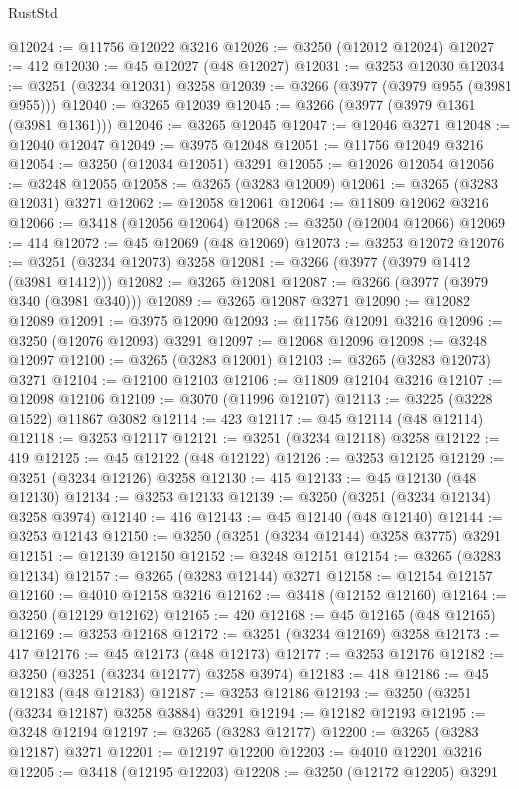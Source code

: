 \begin{lexlean}{RustStd}
\begin{coremodule}
@12024 := @11756 @12022 @3216
@12026 := @3250 (@12012 @12024)
@12027 := 412
@12030 := @45 @12027 (@48 @12027)
@12031 := @3253 @12030
@12034 := @3251 (@3234 @12031) @3258
@12039 := @3266 (@3977 (@3979 @955 (@3981 @955)))
@12040 := @3265 @12039
@12045 := @3266 (@3977 (@3979 @1361 (@3981 @1361)))
@12046 := @3265 @12045
@12047 := @12046 @3271
@12048 := @12040 @12047
@12049 := @3975 @12048
@12051 := @11756 @12049 @3216
@12054 := @3250 (@12034 @12051) @3291
@12055 := @12026 @12054
@12056 := @3248 @12055
@12058 := @3265 (@3283 @12009)
@12061 := @3265 (@3283 @12031) @3271
@12062 := @12058 @12061
@12064 := @11809 @12062 @3216
@12066 := @3418 (@12056 @12064)
@12068 := @3250 (@12004 @12066)
@12069 := 414
@12072 := @45 @12069 (@48 @12069)
@12073 := @3253 @12072
@12076 := @3251 (@3234 @12073) @3258
@12081 := @3266 (@3977 (@3979 @1412 (@3981 @1412)))
@12082 := @3265 @12081
@12087 := @3266 (@3977 (@3979 @340 (@3981 @340)))
@12089 := @3265 @12087 @3271
@12090 := @12082 @12089
@12091 := @3975 @12090
@12093 := @11756 @12091 @3216
@12096 := @3250 (@12076 @12093) @3291
@12097 := @12068 @12096
@12098 := @3248 @12097
@12100 := @3265 (@3283 @12001)
@12103 := @3265 (@3283 @12073) @3271
@12104 := @12100 @12103
@12106 := @11809 @12104 @3216
@12107 := @12098 @12106
@12109 := @3070 (@11996 @12107)
@12113 := @3225 (@3228 @1522) @11867 @3082
@12114 := 423
@12117 := @45 @12114 (@48 @12114)
@12118 := @3253 @12117
@12121 := @3251 (@3234 @12118) @3258
@12122 := 419
@12125 := @45 @12122 (@48 @12122)
@12126 := @3253 @12125
@12129 := @3251 (@3234 @12126) @3258
@12130 := 415
@12133 := @45 @12130 (@48 @12130)
@12134 := @3253 @12133
@12139 := @3250 (@3251 (@3234 @12134) @3258 @3974)
@12140 := 416
@12143 := @45 @12140 (@48 @12140)
@12144 := @3253 @12143
@12150 := @3250 (@3251 (@3234 @12144) @3258 @3775) @3291
@12151 := @12139 @12150
@12152 := @3248 @12151
@12154 := @3265 (@3283 @12134)
@12157 := @3265 (@3283 @12144) @3271
@12158 := @12154 @12157
@12160 := @4010 @12158 @3216
@12162 := @3418 (@12152 @12160)
@12164 := @3250 (@12129 @12162)
@12165 := 420
@12168 := @45 @12165 (@48 @12165)
@12169 := @3253 @12168
@12172 := @3251 (@3234 @12169) @3258
@12173 := 417
@12176 := @45 @12173 (@48 @12173)
@12177 := @3253 @12176
@12182 := @3250 (@3251 (@3234 @12177) @3258 @3974)
@12183 := 418
@12186 := @45 @12183 (@48 @12183)
@12187 := @3253 @12186
@12193 := @3250 (@3251 (@3234 @12187) @3258 @3884) @3291
@12194 := @12182 @12193
@12195 := @3248 @12194
@12197 := @3265 (@3283 @12177)
@12200 := @3265 (@3283 @12187) @3271
@12201 := @12197 @12200
@12203 := @4010 @12201 @3216
@12205 := @3418 (@12195 @12203)
@12208 := @3250 (@12172 @12205) @3291

\end{coremodule}
\end{lexlean}
